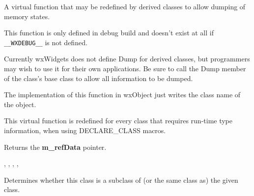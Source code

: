 \label{wxobjectdump}


A virtual function that may be redefined by derived classes to allow dumping of
memory states.

This function is only defined in debug build and doesn't exist at all if
{\tt \_\_WXDEBUG\_\_} is not defined.




Currently wxWidgets does not define Dump for derived classes, but
programmers may wish to use it for their own applications. Be sure to
call the Dump member of the class's base class to allow all information to be
dumped.

The implementation of this function in wxObject just writes the class name of
the object.

\label{wxobjectgetclassinfo}


This virtual function is redefined for every class that requires run-time
type information, when using DECLARE\_CLASS macros.

\label{wxobjectgetrefdata}


Returns the {\bf m\_refData} pointer.


, , ,\rtfsp
{},\rtfsp
{}

\label{wxobjectiskindof}


Determines whether this class is a subclass of (or the same class as)
the given class.





